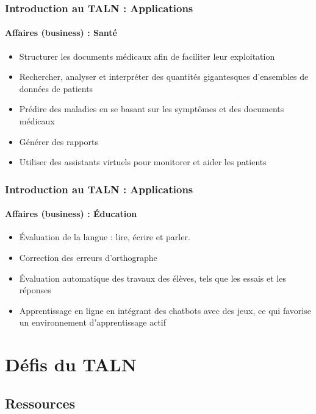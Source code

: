 \documentclass[xcolor=table]{beamer}
\begin{document}
\begin{frame}
\frametitle{Introduction au TALN : Applications}
\framesubtitle{Affaires (business) : Santé}

\begin{itemize}
	\item Structurer les documents médicaux afin de faciliter leur exploitation
	\item Rechercher, analyser et interpréter des quantités gigantesques d'ensembles de données de patients
	\item Prédire des maladies en se basant sur les symptômes et des documents médicaux
	\item Générer des rapports 
	\item Utiliser des assistants virtuels pour monitorer et aider les patients
\end{itemize}

\end{frame}

\begin{frame}
\frametitle{Introduction au TALN : Applications}
\framesubtitle{Affaires (business) : Éducation}

\begin{itemize}
	\item Évaluation de la langue : lire, écrire et parler.
	\item Correction des erreurs d'orthographe 
	\item Évaluation automatique des travaux des élèves, tels que les essais et les réponses
	\item Apprentissage en ligne en intégrant des chatbots avec des jeux, ce qui favorise un environnement d'apprentissage actif
\end{itemize}

\end{frame}

\section{Défis du TALN}

%

\subsection{Ressources}
\end{document}
